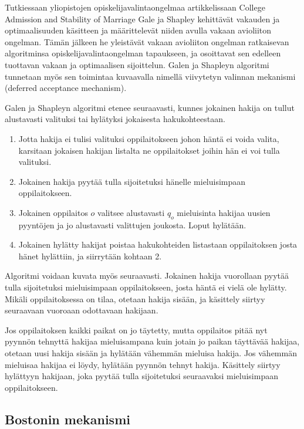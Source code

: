 \documentclass[twoside]{tktltiki}
\begin{document}
Tutkiessaan yliopistojen opiskelijavalintaongelmaa artikkelissaan
College Admission and Stability of Marriage \cite{galeshapley62} Gale
ja Shapley kehittävät vakauden ja optimaalisuuden käsitteen ja
määrittelevät niiden avulla vakaan avioliiton ongelman. Tämän jälkeen
he yleistävät vakaan avioliiton ongelman ratkaisevan algoritminsa
opiskelijavalintaongelman tapaukseen, ja osoittavat sen edelleen
tuottavan vakaan ja optimaalisen sijoittelun. Galen ja Shapleyn
algoritmi tunnetaan myös sen toimintaa kuvaavalla nimellä viivytetyn
valinnan mekanismi (deferred acceptance mechanism).
\newpage

Galen ja Shapleyn algoritmi etenee seuraavasti, kunnes jokainen hakija
on tullut alustavasti valituksi tai hylätyksi jokaisesta
hakukohteestaan.

\begin{enumerate}
\item Jotta hakija ei tulisi valituksi oppilaitokseen johon häntä ei
  voida valita, karsitaan jokaisen hakijan listalta ne oppilaitokset
  joihin hän ei voi tulla valituksi.

\item Jokainen hakija pyytää tulla sijoitetuksi hänelle mieluisimpaan
  oppilaitokseen.

\item Jokainen oppilaitos $o$ valitsee alustavasti $q_o$ mieluisinta
  hakijaa uusien pyyntöjen ja jo alustavasti valittujen joukosta.
  Loput hylätään.

\item Jokainen hylätty hakijat poistaa hakukohteiden listastaan
  oppilaitoksen josta hänet hylättiin, ja siirrytään kohtaan 2.
\end{enumerate}

Algoritmi voidaan kuvata myös seuraavasti. Jokainen hakija vuorollaan
pyytää tulla sijoitetuksi mieluisimpaan oppilaitokseen, josta häntä ei
vielä ole hylätty. Mikäli oppilaitoksessa on tilaa, otetaan hakija
sisään, ja käsittely siirtyy seuraavaan vuoroaan odottavaan hakijaan.

Jos oppilaitoksen kaikki paikat on jo täytetty, mutta oppilaitos pitää
nyt pyynnön tehnyttä hakijaa mieluisampana kuin jotain jo paikan
täyttävää hakijaa, otetaan uusi hakija sisään ja hylätään vähemmän
mieluisa hakija. Jos vähemmän mieluisaa hakijaa ei löydy, hylätään
pyynnön tehnyt hakija. Käsittely siirtyy hylättyyn hakijaan, joka
pyytää tulla sijoitetuksi seuraavaksi mieluisimpaan oppilaitokseen.

\subsection{Bostonin mekanismi}
\end{document}

